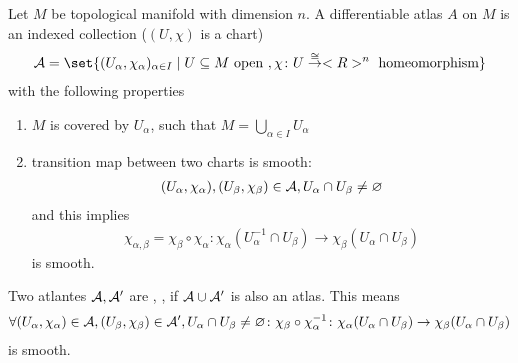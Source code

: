 \begin{definition}
	Let $M$ be topological manifold with dimension $n$. A differentiable atlas $A$ on $M$ is an indexed collection ($(U,\chi)$ is a chart)
	\begin{align*}
		\AA = \set{(U_{\alpha},\chi_{\alpha})_{\alpha \in I} \mid U \subseteq M \open, \chi\colon U \overset{\cong}{\to} \Rn \text{ homeomorphism}}
	\end{align*}
	with the following properties
	\begin{enumerate}
		\item $M$ is covered by $U_{\alpha}$, such that $M = \bigcup_{\alpha \in I} U_{\alpha}$
		\item transition map between two charts is smooth: 
		\begin{align*}
			(U_{\alpha}, \chi_{\alpha}), (U_{\beta},\chi_{\beta}) \in \AA, U_{\alpha}\cap U_{\beta} \neq \emptyset
		\end{align*}
		and this implies 
		\begin{align*}
			\chi_{\alpha, \beta} = \chi_{\beta} \circ \chi_{\alpha} \colon \chi_{\alpha}(U_{\alpha}^{-1} \cap U_{\beta}) \to \chi_{\beta}(U_{\alpha} \cap U_{\beta})
		\end{align*}
		is smooth.
	\end{enumerate}
\end{definition}
\begin{definition}
	Two atlantes $\AA, \AA'$ are , , if $\AA \cup \AA'$ is also an atlas. This means
	\begin{align*}
		\forall (U_{\alpha},\chi_{\alpha}) \in \AA, (U_{\beta},\chi_{\beta}) \in \AA', U_{\alpha} \cap U_{\beta} \neq \emptyset\colon \chi_{\beta} \circ \chi_{\alpha}^{-1}\colon \chi_{\alpha}(U_{\alpha}\cap U_{\beta}) \to \chi_{\beta}(U_{\alpha} \cap U_{\beta})
	\end{align*}
	is smooth.
\end{definition}
